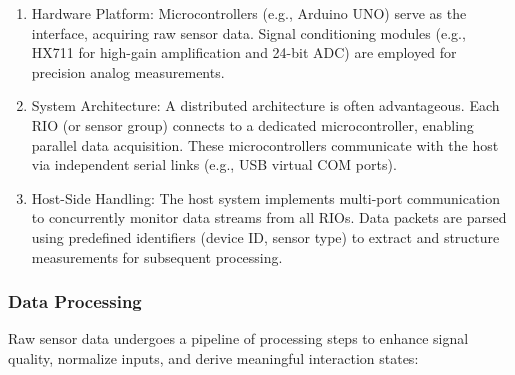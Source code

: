 \documentclass[runningheads]{llncs}
\begin{document}
\begin{enumerate}
  \item Hardware Platform: Microcontrollers (e.g., Arduino UNO) serve as the interface, acquiring raw sensor data. Signal conditioning modules (e.g., HX711 for high-gain amplification and 24-bit ADC) are employed for precision analog measurements.

  \item System Architecture: A distributed architecture is often advantageous. Each RIO (or sensor group) connects to a dedicated microcontroller, enabling parallel data acquisition. These microcontrollers communicate with the host via independent serial links (e.g., USB virtual COM ports).
  
  \item Host-Side Handling: The host system implements multi-port communication to concurrently monitor data streams from all RIOs. Data packets are parsed using predefined identifiers (device ID, sensor type) to extract and structure measurements for subsequent processing.
\end{enumerate}

\subsubsection{Data Processing}
Raw sensor data undergoes a pipeline of processing steps to enhance signal quality, normalize inputs, and derive meaningful interaction states:
\end{document}

